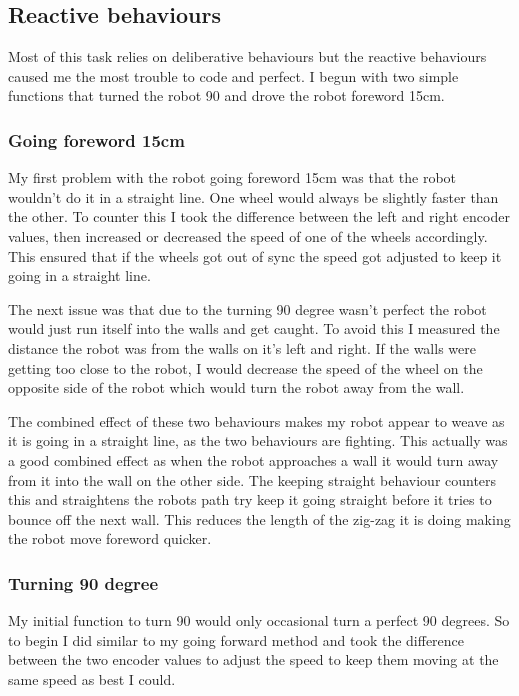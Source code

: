 \documentclass[11pt,a4paper,titlepage]{article}
\begin{document}
        \subsection{Reactive behaviours}
            Most of this task relies on deliberative behaviours but the reactive behaviours caused me the most trouble to code and perfect.
            I begun with two simple functions that turned the robot 90 and drove the robot foreword 15cm.
            \subsubsection{Going foreword 15cm}
                My first problem with the robot going foreword 15cm was that the robot wouldn't do it in a straight line.
                One wheel would always be slightly faster than the other.
                To counter this I took the difference between the left and right encoder values, then increased or decreased the speed of one of the wheels accordingly.
                This ensured that if the wheels got out of sync the speed got adjusted to keep it going in a straight line.
               
                The next issue was that due to the turning 90 degree wasn't perfect the robot would just run itself into the walls and get caught.
                To avoid this I measured the distance the robot was from the walls on it's left and right.
                If the walls were getting too close to the robot, I would decrease the speed of the wheel on the opposite side of the robot which would turn the robot away from the wall.
                
                The combined effect of these two behaviours makes my robot appear to weave as it is going in a straight line, as the two behaviours are fighting.
                This actually was a good combined effect as when the robot approaches a wall it would turn away from it into the wall on the other side. 
                The keeping straight behaviour counters this and straightens the robots path try keep it going straight before it tries to bounce off the next wall.
                This reduces the length of the zig-zag it is doing making the robot move foreword quicker.
            \subsubsection{Turning 90 degree}
                My initial function to turn 90 would only occasional turn a perfect 90 degrees. 
                So to begin I did similar to my going forward method and took the difference between the two encoder values to adjust the speed to keep them moving at the same speed as best I could. 
                
\end{document}
